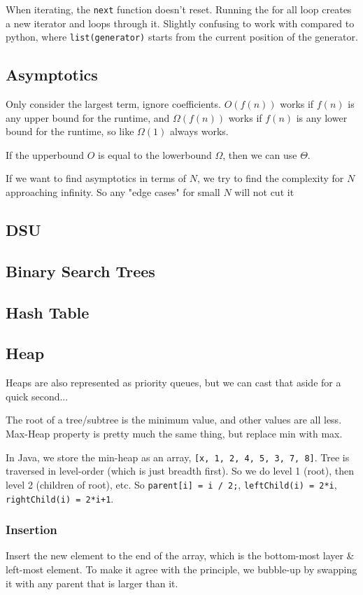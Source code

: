 \documentclass{article}
\newcommand{\code}{\texttt}
\begin{document}
When iterating, the \code{next} function doesn't reset. Running the for all loop creates a new iterator and loops through it. Slightly confusing to work with compared to python, where \code{list(generator)} starts from the current position of the generator.
\subsection{Asymptotics}
Only consider the largest term, ignore coefficients. $O(f(n))$ works if $f(n)$ is any upper bound for the runtime, and $\Omega(f(n))$ works
if $f(n)$ is any lower bound for the runtime, so like $\Omega(1)$ always works.

If the upperbound $O$ is equal to the lowerbound $\Omega$, then we can use $\Theta$.

If we want to find asymptotics in terms of $N$, we try to find the complexity for $N$ approaching infinity. So any "edge cases" for small $N$ will not cut it
\subsection{DSU}
\subsection{Binary Search Trees}
\subsection{Hash Table}
\subsection{Heap}
Heaps are also represented as priority queues, but we can cast that aside for a quick second...

\begin{definition}
The root of a tree/subtree is the minimum value, and other values are all less. Max-Heap property is pretty much the same thing, but replace min with max.
\end{definition}

In Java, we store the min-heap as an array, \code{[x, 1, 2, 4, 5, 3, 7, 8]}. Tree is traversed in level-order (which is just breadth first).
So we do level 1 (root), then level 2 (children of root), etc. So \code{parent[i] = i / 2;}, \code{leftChild(i) = 2*i}, \code{rightChild(i) = 2*i+1}.

\subsubsection{Insertion}
Insert the new element to the end of the array, which is the bottom-most layer \& left-most element. 
To make it agree with the principle, we bubble-up by swapping it with any parent that is larger than it. 
\end{document}
